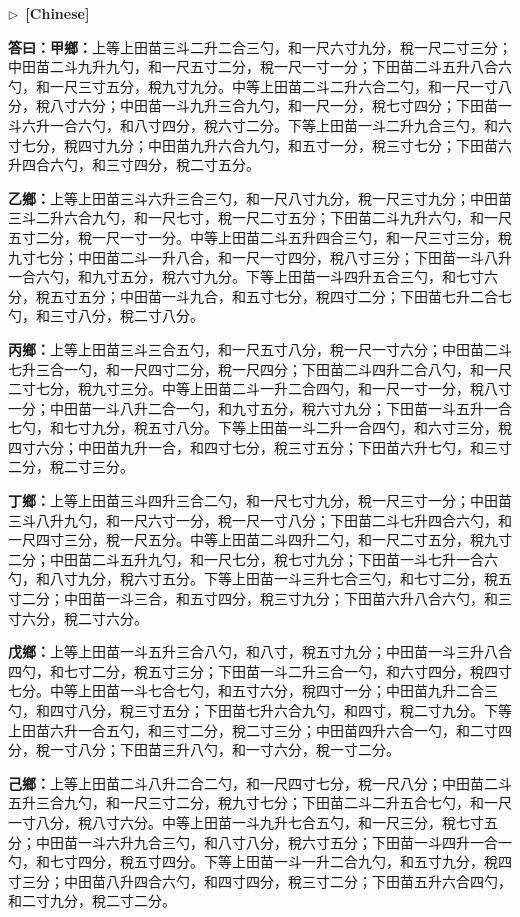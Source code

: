 \documentclass[10pt,a4paper]{article}
\newcommand{\CNmarker}{\noindent\textcolor{cnlabel}{$\triangleright$\ \textbf{[Chinese]}}\par}
\newcommand{\Answer}[1]{\par\noindent\textbf{\color{answercolor}答曰：}#1\par}
\begin{document}
\CNmarker
\Answer{\textbf{甲鄉：}上等上田苗三斗二升二合三勺，和一尺六寸九分，稅一尺二寸三分；中田苗二斗九升九勺，和一尺五寸二分，稅一尺一寸一分；下田苗二斗五升八合六勺，和一尺三寸五分，稅九寸九分。中等上田苗二斗二升六合二勺，和一尺一寸八分，稅八寸六分；中田苗一斗九升三合九勺，和一尺一分，稅七寸四分；下田苗一斗六升一合六勺，和八寸四分，稅六寸二分。下等上田苗一斗二升九合三勺，和六寸七分，稅四寸九分；中田苗九升六合九勺，和五寸一分，稅三寸七分；下田苗六升四合六勺，和三寸四分，稅二寸五分。

\textbf{乙鄉：}上等上田苗三斗六升三合三勺，和一尺八寸九分，稅一尺三寸九分；中田苗三斗二升六合九勺，和一尺七寸，稅一尺二寸五分；下田苗二斗九升六勺，和一尺五寸二分，稅一尺一寸一分。中等上田苗二斗五升四合三勺，和一尺三寸三分，稅九寸七分；中田苗二斗一升八合，和一尺一寸四分，稅八寸三分；下田苗一斗八升一合六勺，和九寸五分，稅六寸九分。下等上田苗一斗四升五合三勺，和七寸六分，稅五寸五分；中田苗一斗九合，和五寸七分，稅四寸二分；下田苗七升二合七勺，和三寸八分，稅二寸八分。

\textbf{丙鄉：}上等上田苗三斗三合五勺，和一尺五寸八分，稅一尺一寸六分；中田苗二斗七升三合一勺，和一尺四寸二分，稅一尺四分；下田苗二斗四升二合八勺，和一尺二寸七分，稅九寸三分。中等上田苗二斗一升二合四勺，和一尺一寸一分，稅八寸一分；中田苗一斗八升二合一勺，和九寸五分，稅六寸九分；下田苗一斗五升一合七勺，和七寸九分，稅五寸八分。下等上田苗一斗二升一合四勺，和六寸三分，稅四寸六分；中田苗九升一合，和四寸七分，稅三寸五分；下田苗六升七勺，和三寸二分，稅二寸三分。

\textbf{丁鄉：}上等上田苗三斗四升三合二勺，和一尺七寸九分，稅一尺三寸一分；中田苗三斗八升九勺，和一尺六寸一分，稅一尺一寸八分；下田苗二斗七升四合六勺，和一尺四寸三分，稅一尺五分。中等上田苗二斗四升二勺，和一尺二寸五分，稅九寸二分；中田苗二斗五升九勺，和一尺七分，稅七寸九分；下田苗一斗七升一合六勺，和八寸九分，稅六寸五分。下等上田苗一斗三升七合三勺，和七寸二分，稅五寸二分；中田苗一斗三合，和五寸四分，稅三寸九分；下田苗六升八合六勺，和三寸六分，稅二寸六分。

\textbf{戊鄉：}上等上田苗一斗五升三合八勺，和八寸，稅五寸九分；中田苗一斗三升八合四勺，和七寸二分，稅五寸三分；下田苗一斗二升三合一勺，和六寸四分，稅四寸七分。中等上田苗一斗七合七勺，和五寸六分，稅四寸一分；中田苗九升二合三勺，和四寸八分，稅三寸五分；下田苗七升六合九勺，和四寸，稅二寸九分。下等上田苗六升一合五勺，和三寸二分，稅二寸三分；中田苗四升六合一勺，和二寸四分，稅一寸八分；下田苗三升八勺，和一寸六分，稅一寸二分。

\textbf{己鄉：}上等上田苗二斗八升二合二勺，和一尺四寸七分，稅一尺八分；中田苗二斗五升三合九勺，和一尺三寸二分，稅九寸七分；下田苗二斗二升五合七勺，和一尺一寸八分，稅八寸六分。中等上田苗一斗九升七合五勺，和一尺三分，稅七寸五分；中田苗一斗六升九合三勺，和八寸八分，稅六寸五分；下田苗一斗四升一合一勺，和七寸四分，稅五寸四分。下等上田苗一斗一升二合九勺，和五寸九分，稅四寸三分；中田苗八升四合六勺，和四寸四分，稅三寸二分；下田苗五升六合四勺，和二寸九分，稅二寸二分。

}
\end{document}
